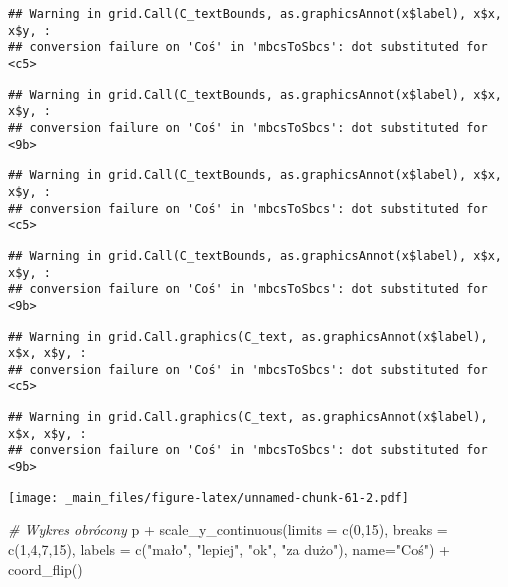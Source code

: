 \documentclass[
]{book}
\newenvironment{Shaded}{\begin{snugshade}}{\end{snugshade}}
\newcommand{\AttributeTok}[1]{\textcolor[rgb]{0.77,0.63,0.00}{#1}}
\newcommand{\CommentTok}[1]{\textcolor[rgb]{0.56,0.35,0.01}{\textit{#1}}}
\newcommand{\DecValTok}[1]{\textcolor[rgb]{0.00,0.00,0.81}{#1}}
\newcommand{\FunctionTok}[1]{\textcolor[rgb]{0.00,0.00,0.00}{#1}}
\newcommand{\NormalTok}[1]{#1}
\newcommand{\SpecialCharTok}[1]{\textcolor[rgb]{0.00,0.00,0.00}{#1}}
\newcommand{\StringTok}[1]{\textcolor[rgb]{0.31,0.60,0.02}{#1}}
\begin{document}
\begin{verbatim}
## Warning in grid.Call(C_textBounds, as.graphicsAnnot(x$label), x$x, x$y, :
## conversion failure on 'Coś' in 'mbcsToSbcs': dot substituted for <c5>
\end{verbatim}

\begin{verbatim}
## Warning in grid.Call(C_textBounds, as.graphicsAnnot(x$label), x$x, x$y, :
## conversion failure on 'Coś' in 'mbcsToSbcs': dot substituted for <9b>
\end{verbatim}

\begin{verbatim}
## Warning in grid.Call(C_textBounds, as.graphicsAnnot(x$label), x$x, x$y, :
## conversion failure on 'Coś' in 'mbcsToSbcs': dot substituted for <c5>
\end{verbatim}

\begin{verbatim}
## Warning in grid.Call(C_textBounds, as.graphicsAnnot(x$label), x$x, x$y, :
## conversion failure on 'Coś' in 'mbcsToSbcs': dot substituted for <9b>
\end{verbatim}

\begin{verbatim}
## Warning in grid.Call.graphics(C_text, as.graphicsAnnot(x$label), x$x, x$y, :
## conversion failure on 'Coś' in 'mbcsToSbcs': dot substituted for <c5>
\end{verbatim}

\begin{verbatim}
## Warning in grid.Call.graphics(C_text, as.graphicsAnnot(x$label), x$x, x$y, :
## conversion failure on 'Coś' in 'mbcsToSbcs': dot substituted for <9b>
\end{verbatim}

\texttt{[image: \_main\_files/figure-latex/unnamed-chunk-61-2.pdf]}

\begin{Shaded}
\begin{Highlighting}[]
\CommentTok{\# Wykres obrócony}
\NormalTok{p }\SpecialCharTok{+} \FunctionTok{scale\_y\_continuous}\NormalTok{(}\AttributeTok{limits =} \FunctionTok{c}\NormalTok{(}\DecValTok{0}\NormalTok{,}\DecValTok{15}\NormalTok{), }\AttributeTok{breaks =} \FunctionTok{c}\NormalTok{(}\DecValTok{1}\NormalTok{,}\DecValTok{4}\NormalTok{,}\DecValTok{7}\NormalTok{,}\DecValTok{15}\NormalTok{), }
                       \AttributeTok{labels =} \FunctionTok{c}\NormalTok{(}\StringTok{"mało"}\NormalTok{, }\StringTok{"lepiej"}\NormalTok{, }\StringTok{"ok"}\NormalTok{, }\StringTok{"za dużo"}\NormalTok{), }
                       \AttributeTok{name=}\StringTok{"Coś"}\NormalTok{) }\SpecialCharTok{+} \FunctionTok{coord\_flip}\NormalTok{()}
\end{Highlighting}
\end{Shaded}
\end{document}
